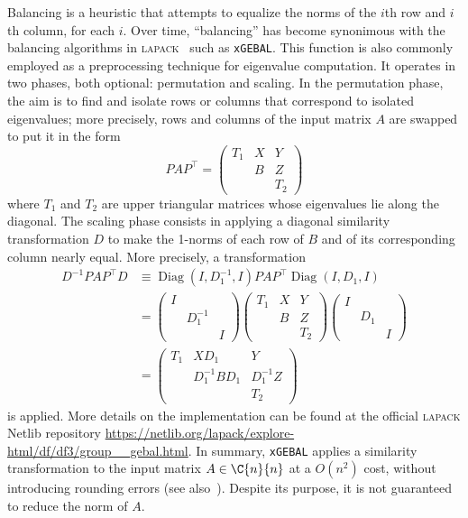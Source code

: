 Balancing is a heuristic that attempts to equalize the norms of the $i$th row and $i$th column, for each $i$. Over time, ``balancing'' has become synonimous with the balancing algorithms in \textsc{lapack}~\cite{lapack:book} such as \texttt{xGEBAL}. This function is also commonly employed as a preprocessing technique for eigenvalue computation. It operates in two phases, both optional: permutation and scaling. In the permutation phase, the aim is to find and isolate rows or columns that correspond to isolated eigenvalues; more precisely, rows and columns of the input matrix $A$ are swapped to put it in the form
\[
	PAP^{\top} = \begin{pmatrix}
		T_1 & X & Y\\
		 & B & Z\\
		 & & T_2
	\end{pmatrix}
\]
where $T_1$ and $T_2$ are upper triangular matrices whose eigenvalues lie along the diagonal. The scaling phase consists in applying a diagonal similarity transformation $D$ to make the 1-norms of each row of $B$ and of its corresponding column nearly equal. More precisely, a transformation
\begin{align*}
	D^{-1}PAP^{\top}D &\equiv\operatorname{Diag}(I,D_1^{-1},I)PAP^{\top}\operatorname{Diag}(I,D_1,I)\\
	&=\begin{pmatrix}
		I & 	   & \\
		  & D_1^{-1} & \\
		  &		   & I
	\end{pmatrix}
	\begin{pmatrix}
		T_1 & X & Y\\
		& B & Z\\
		& & T_2
	\end{pmatrix}
	\begin{pmatrix}
		I & & \\
		& D_1 & \\
		&   & I
	\end{pmatrix}\\
	&=\begin{pmatrix}
		T_1 & XD_1 & Y\\
		& D_1^{-1}BD_1 & D_1^{-1}Z\\
		& & T_2
	\end{pmatrix}
\end{align*}
is applied. More details on the implementation can be found at the official \textsc{lapack} Netlib repository \url{https://netlib.org/lapack/explore-html/df/df3/group__gebal.html}. In summary, \texttt{xGEBAL} applies a similarity transformation to the input matrix $A\in\C{n}{n}$ at a $O(n^2)$ cost, without introducing rounding errors (see also~\cite[§~4.10]{higham:matfun_book}). Despite its purpose, it is not guaranteed to reduce the norm of $A$.
\smallskip 

